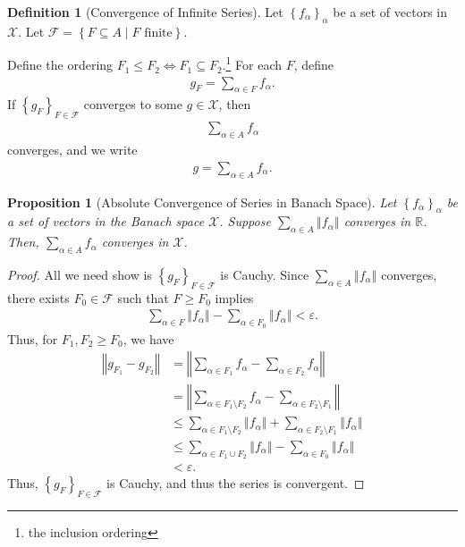 \documentclass[10pt]{extarticle}
\newcommand{\R}{\mathbb{R}}
\newcommand{\norm}[1]{\left\Vert #1\right\Vert}
\newcommand{\set}[1]{\left\{#1\right\}}
\newcommand{\ve}{\varepsilon}
\theoremstyle{plain}
\newtheorem*{proposition}{Proposition}
\theoremstyle{definition}
\newtheorem*{definition}{Definition}
\theoremstyle{note}
\renewcommand{\newline}{\hfill\break}
\begin{document}
\begin{definition}[Convergence of Infinite Series]
  Let $\set{f_{\alpha}}_{\alpha}$ be a set of vectors in $\mathcal{X}$. Let $\mathcal{F} = \set{F\subseteq A\mid F\text{ finite}}$.\newline

  Define the ordering $F_1\leq F_2 \Leftrightarrow F_1 \subseteq F_2$.\footnote{the inclusion ordering} For each $F$, define
  \begin{align*}
    g_F = \sum_{\alpha \in F}f_{\alpha}.
  \end{align*}
  If $\set{g_F}_{F\in \mathcal{F}}$ converges to some $g\in \mathcal{X}$, then
  \begin{align*}
    \sum_{\alpha \in A}f_{\alpha}
  \end{align*}
  converges, and we write
  \begin{align*}
    g = \sum_{\alpha \in A}f_{\alpha}.
  \end{align*}
\end{definition}
\begin{proposition}[Absolute Convergence of Series in Banach Space]
  Let $\set{f_{\alpha}}_{\alpha}$ be a set of vectors in the Banach space $\mathcal{X}$. Suppose $\displaystyle \sum_{\alpha \in A}\norm{f_{\alpha}}$ converges in $\R$. Then, $\sum_{\alpha \in A}f_{\alpha}$ converges in $\mathcal{X}$.
\end{proposition}
\begin{proof}
  All we need show is $\set{g_{F}}_{F\in \mathcal{F}}$ is Cauchy. Since $\displaystyle \sum_{\alpha \in A}\norm{f_{\alpha}}$ converges, there exists $F_0\in \mathcal{F}$ such that $F\geq F_{0}$ implies
  \begin{align*}
    \sum_{\alpha \in F} \norm{f_{\alpha}} - \sum_{\alpha \in F_{0}}\norm{f_{\alpha}} < \ve.
  \end{align*}
  Thus, for $F_1,F_2 \geq F_0$, we have
  \begin{align*}
    \norm{g_{F_1} - g_{F_2}} &= \norm{\sum_{\alpha \in F_1}f_{\alpha} - \sum_{\alpha \in F_2}f_{\alpha}}\\
                             &= \norm{\sum_{\alpha \in F_1\setminus F_2}f_{\alpha} - \sum_{\alpha \in F_2\setminus F_1}}\\
                             &\leq \sum_{\alpha \in F_{1}\setminus F_2} \norm{f_{\alpha}} + \sum_{\alpha \in F_2\setminus F_1}\norm{f_{\alpha}}\\
                             &\leq \sum_{\alpha \in F_1\cup F_2}\norm{f_{\alpha}} - \sum_{\alpha \in F_0}\norm{f_{\alpha}}\\
                             &< \ve.
  \end{align*}
  Thus, $\set{g_{F}}_{F\in \mathcal{F}}$ is Cauchy, and thus the series is convergent.
\end{proof}
\end{document}

